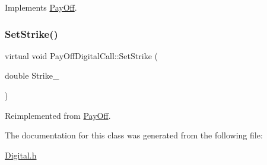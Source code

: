 Implements \hyperlink{classPayOff_a5ae17d82c233ef5568c8fb0539703000}{Pay\+Off}.

\hypertarget{classPayOffDigitalCall_a9f491f0704d09a233af8bb49c4eaed9e}{}\label{classPayOffDigitalCall_a9f491f0704d09a233af8bb49c4eaed9e} 
\subsubsection{\texorpdfstring{Set\+Strike()}{SetStrike()}}
{\footnotesize\ttfamily virtual void Pay\+Off\+Digital\+Call\+::\+Set\+Strike (\begin{DoxyParamCaption}\item[{double}]{Strike\+\_\+ }\end{DoxyParamCaption})\hspace{0.3cm}{\ttfamily [virtual]}}



Reimplemented from \hyperlink{classPayOff_a3fdefed95df90a057acfd697f5703e04}{Pay\+Off}.



The documentation for this class was generated from the following file\+:\begin{DoxyCompactItemize}
\item 
\hyperlink{Digital_8h}{Digital.\+h}\end{DoxyCompactItemize}

